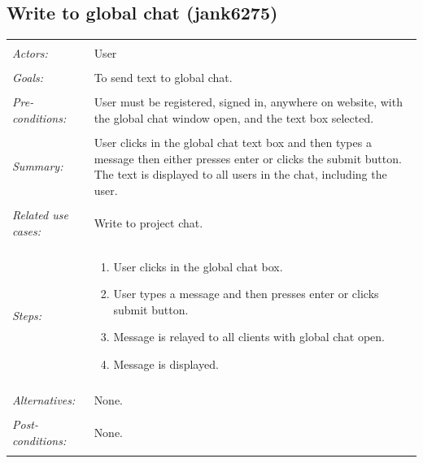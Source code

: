 \documentclass[11pt]{report}
\begin{document}
\subsection{Write to global chat (jank6275)}
\begin{tabular}{ p{2cm} p{12cm} }
 \hline
 \\
 \textit{Actors:} & User \\ 
 \\
 \textit{Goals:} & To send text to global chat. \\
 \\
 \textit{Pre-conditions:} & User must be registered, signed in, anywhere on website, with the global chat window open, and the text box selected.  \\
 \\
 \textit{Summary:} & User clicks in the global chat text box and then types a message then either presses enter or clicks the submit button. The text is displayed to all users in the chat, including the user. \\ 
 \\
 \textit{Related use cases:} & Write to project chat. \\ 
 \\
 \textit{Steps:} & \begin{enumerate}
  \item User clicks in the global chat box.
  \item User types a message and then presses enter or clicks submit button.
  \item Message is relayed to all clients with global chat open.
  \item Message is displayed.
 \end{enumerate} \\
 \\
 \textit{Alternatives:} & None. \\
 \\
 \textit{Post-conditions:} & None. \\
 \\
\hline
\end{tabular}
\end{document}
